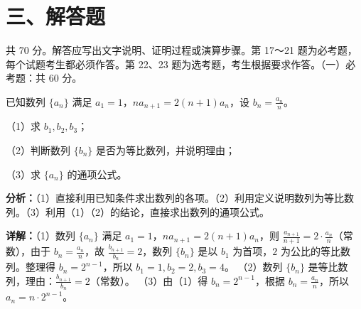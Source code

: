 \section*{三、解答题}
共 70 分。解答应写出文字说明、证明过程或演算步骤。第 17～21 题为必考题，每个试题考生都必须作答。第 22、23 题为选考题，考生根据要求作答。（一）必考题：共 60 分。

\begin{question}[points=12]
已知数列 $\{a_n\}$ 满足 $a_1=1$，$na_{n+1}=2(n+1)a_n$，设 $b_n=\frac{a_n}{n}$。

（1）求 $b_1,b_2,b_3$；

（2）判断数列 $\{b_n\}$ 是否为等比数列，并说明理由；

（3）求 $\{a_n\}$ 的通项公式。
\begin{solution}

\textbf{分析：}（1）直接利用已知条件求出数列的各项。（2）利用定义说明数列为等比数列。（3）利用（1）（2）的结论，直接求出数列的通项公式。

\textbf{详解：}（1）数列 $\{a_n\}$ 满足 $a_1=1$，$na_{n+1}=2(n+1)a_n$，则 $\frac{a_{n+1}}{n+1}=2\cdot\frac{a_n}{n}$（常数），由于 $b_n=\frac{a_n}{n}$，故 $\frac{b_{n+1}}{b_n}=2$，数列 $\{b_n\}$ 是以 $b_1$ 为首项，$2$ 为公比的等比数列。整理得 $b_n=2^{n-1}$，所以 $b_1=1,b_2=2,b_3=4$。
（2）数列 $\{b_n\}$ 是等比数列，理由：$\frac{b_{n+1}}{b_n}=2$（常数）。
（3）由（1）得 $b_n=2^{n-1}$，根据 $b_n=\frac{a_n}{n}$，所以 $a_n=n\cdot2^{n-1}$。
\end{solution}
\end{question}

